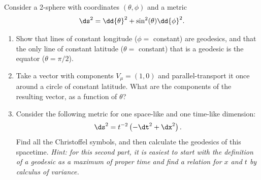 \begin{problem}[1]
  Consider a 2-sphere with coordinates $(\theta, \phi)$ and a metric
  \[%
    \ds^2 = \dd{\theta}^2 + \sin^2(\theta) \dd{\phi}^2
  .\]%
  \begin{enumerate}
    \item Show that lines of constant longitude ($\phi =$ constant) are geodesics, and that the only line of constant latitude ($\theta =$ constant) that is a geodesic is the equator ($\theta = \pi/2$).
    \item Take a vector with components $V_\mu = (1, 0)$ and parallel-transport it once around a circle of constant latitude. What are the components of the resulting vector, as a function of $\theta$?
    \item Consider the following metric for one space-like and one time-like dimension:
      \[%
        \ds^2 = t^{-2}\left(-\dt^2 + \dx^2\right)
      .\]%
      Find all the Christoffel symbols, and then calculate the geodesics of this spacetime. \textit{Hint: for this second part, it is easiest to start with the definition of a geodesic as a maximum of proper time and find a relation for $x$ and $t$ by calculus of variance.}
  \end{enumerate}
\end{problem}

